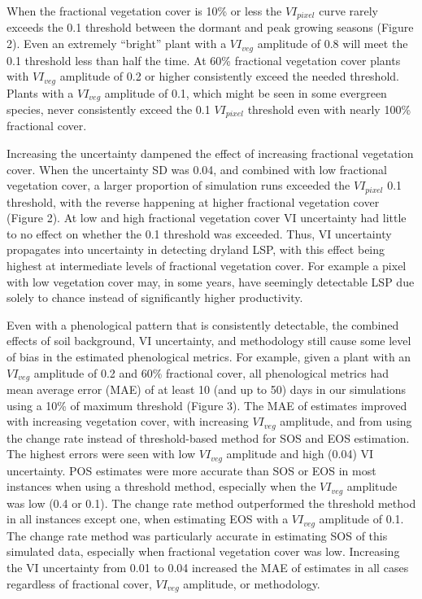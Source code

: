 \documentclass{article}
\begin{document}
When the fractional vegetation cover is 10\% or less the $VI_{pixel}$ curve rarely exceeds the 0.1 threshold between the dormant and peak growing seasons (Figure 2). Even an extremely “bright” plant with a $VI_{veg}$ amplitude of 0.8 will meet the 0.1 threshold less than half the time. At 60\% fractional vegetation cover plants with $VI_{veg}$ amplitude of 0.2 or higher consistently exceed the needed threshold. Plants with a $VI_{veg}$ amplitude of 0.1, which might be seen in some evergreen species, never consistently exceed the 0.1 $VI_{pixel}$ threshold even with nearly 100\% fractional cover.

Increasing the uncertainty dampened the effect of increasing fractional vegetation cover. When the uncertainty SD was 0.04, and combined with low fractional vegetation cover, a larger proportion of simulation runs exceeded the $VI_{pixel}$ 0.1 threshold, with the reverse happening at higher fractional vegetation cover (Figure 2). At low and high fractional vegetation cover VI uncertainty had little to no effect on whether the 0.1 threshold was exceeded. Thus, VI uncertainty propagates into uncertainty in detecting dryland LSP, with this effect being highest at intermediate levels of fractional vegetation cover. For example a pixel with low vegetation cover may, in some years, have seemingly detectable LSP due solely to chance instead of significantly higher productivity. 

Even with a phenological pattern that is consistently detectable, the combined effects of soil background, VI uncertainty, and methodology still cause some level of bias in the estimated phenological metrics. For example, given a plant with an $VI_{veg}$ amplitude of 0.2 and 60\% fractional cover, all phenological metrics had mean average error (MAE) of at least 10 (and up to 50) days in our simulations using a 10\% of maximum threshold (Figure 3). The MAE of estimates improved with increasing vegetation cover, with increasing $VI_{veg}$ amplitude, and from using the change rate instead of threshold-based method for SOS and EOS estimation. The highest errors were seen with low $VI_{veg}$ amplitude and high (0.04) VI uncertainty. POS estimates were more accurate than SOS or EOS in most instances when using a threshold method, especially when the $VI_{veg}$ amplitude was low (0.4 or 0.1). The change rate method outperformed the threshold method in all instances except one, when estimating EOS with a $VI_{veg}$ amplitude of 0.1. The change rate method was particularly accurate in estimating SOS of this simulated data, especially when fractional vegetation cover was low. Increasing the VI uncertainty from 0.01 to 0.04 increased the MAE of estimates in all cases regardless of fractional cover, $VI_{veg}$ amplitude, or methodology.
\end{document}
